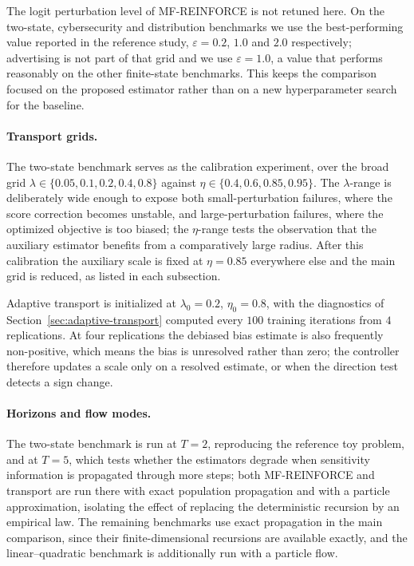 The logit perturbation level of MF-REINFORCE is not retuned here. On the two-state, cybersecurity and distribution benchmarks we use the best-performing value reported in the reference study, $\varepsilon=0.2$, $1.0$ and $2.0$ respectively; advertising is not part of that grid and we use $\varepsilon=1.0$, a value that performs reasonably on the other finite-state benchmarks. This keeps the comparison focused on the proposed estimator rather than on a new hyperparameter search for the baseline.

\paragraph{Transport grids.}
The two-state benchmark serves as the calibration experiment, over the broad grid $\lambda\in\{0.05,0.1,0.2,0.4,0.8\}$ against $\eta\in\{0.4,0.6,0.85,0.95\}$. The $\lambda$-range is deliberately wide enough to expose both small-perturbation failures, where the score correction becomes unstable, and large-perturbation failures, where the optimized objective is too biased; the $\eta$-range tests the observation that the auxiliary estimator benefits from a comparatively large radius. After this calibration the auxiliary scale is fixed at $\eta=0.85$ everywhere else and the main grid is reduced, as listed in each subsection.

Adaptive transport is initialized at $\lambda_0=0.2$, $\eta_0=0.8$, with the diagnostics of Section~\ref{sec:adaptive-transport} computed every $100$ training iterations from $4$ replications. At four replications the debiased bias estimate is also frequently non-positive, which means the bias is unresolved rather than zero; the controller therefore updates a scale only on a resolved estimate, or when the direction test detects a sign change.

\paragraph{Horizons and flow modes.}
The two-state benchmark is run at $T=2$, reproducing the reference toy problem, and at $T=5$, which tests whether the estimators degrade when sensitivity information is propagated through more steps; both MF-REINFORCE and transport are run there with exact population propagation and with a particle approximation, isolating the effect of replacing the deterministic recursion by an empirical law. The remaining benchmarks use exact propagation in the main comparison, since their finite-dimensional recursions are available exactly, and the linear--quadratic benchmark is additionally run with a particle flow.

